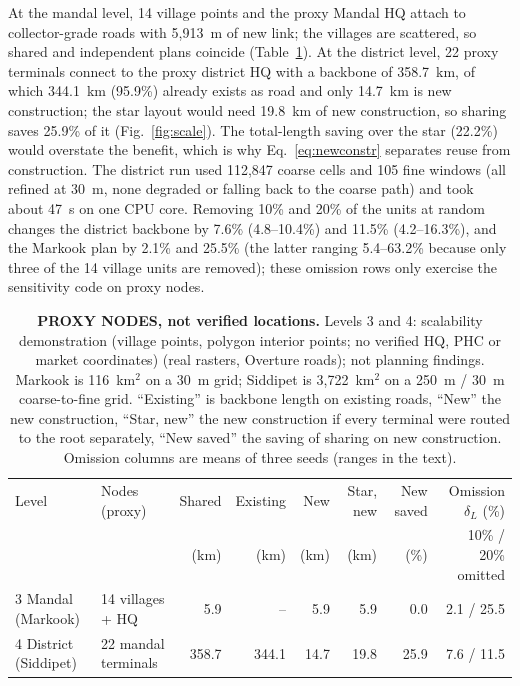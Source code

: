 \documentclass[journal]{IEEEtran}
\begin{document}
At the mandal level, 14 village points and the proxy Mandal HQ attach to collector-grade roads with 5{,}913~m of new link; the villages are scattered, so shared and independent plans coincide (Table~\ref{tab:scale}). At the district level, 22 proxy terminals connect to the proxy district HQ with a backbone of 358.7~km, of which 344.1~km (95.9\%) already exists as road and only 14.7~km is new construction; the star layout would need 19.8~km of new construction, so sharing saves 25.9\% of it (Fig.~\ref{fig:scale}). The total-length saving over the star (22.2\%) would overstate the benefit, which is why Eq.~\eqref{eq:newconstr} separates reuse from construction. The district run used 112{,}847 coarse cells and 105 fine windows (all refined at 30~m, none degraded or falling back to the coarse path) and took about 47~s on one CPU core. Removing 10\% and 20\% of the units at random changes the district backbone by 7.6\% (4.8--10.4\%) and 11.5\% (4.2--16.3\%), and the Markook plan by 2.1\% and 25.5\% (the latter ranging 5.4--63.2\% because only three of the 14 village units are removed); these omission rows only exercise the sensitivity code on proxy nodes.

\begin{table}[t]
\centering
\caption{\textbf{PROXY NODES, not verified locations.} Levels 3 and 4: scalability demonstration (village points, polygon interior points; no verified HQ, PHC or market coordinates) (real rasters, Overture roads); not planning findings. Markook is 116~km$^2$ on a 30~m grid; Siddipet is 3{,}722~km$^2$ on a 250~m / 30~m coarse-to-fine grid. ``Existing'' is backbone length on existing roads, ``New'' the new construction, ``Star, new'' the new construction if every terminal were routed to the root separately, ``New saved'' the saving of sharing on new construction. Omission columns are means of three seeds (ranges in the text).}
\label{tab:scale}
\footnotesize
\setlength{\tabcolsep}{3pt}
\begin{tabular}{@{}llrrrrrr@{}}
\toprule
Level & Nodes (proxy) & Shared & Existing & New & Star, new & New saved & Omission $\delta_L$ (\%)\\
 & & (km) & (km) & (km) & (km) & (\%) & 10\% / 20\% omitted\\
\midrule
3 Mandal (Markook) & 14 villages + HQ & 5.9 & -- & 5.9 & 5.9 & 0.0 & 2.1 / 25.5\\
4 District (Siddipet) & 22 mandal terminals & 358.7 & 344.1 & 14.7 & 19.8 & 25.9 & 7.6 / 11.5\\
\bottomrule
\end{tabular}
\end{table}
\end{document}
